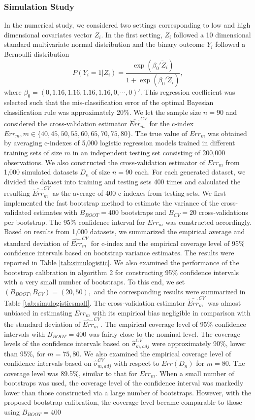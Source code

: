 \documentclass[12pt]{article}
\begin{document}
\subsubsection{Simulation Study}

In the numerical study,  we considered two settings corresponding to low and high dimensional covariates vector  $Z_i.$ In the first setting, $Z_i$ followed a 10 dimensional standard multivariate normal distribution and the binary outcome $Y_i$ followed a Bernoulli distribution 
$$P(Y_i=1|Z_i)=\frac{\exp(\beta_0'\tilde{Z}_i)}{1+\exp(\beta_0'\tilde{Z}_i)},$$
where $\beta_0=(0, 1.16, 1.16, 1.16, 1.16, 0, \cdots, 0)'.$ This regression coefficient was selected such that the mis-classification error of the optimal Bayesian classification rule was approximately 20\%. We let the sample size $n=90$ and considered the cross-validation estimator $\widehat{Err}_m^{CV}$ for the c-index $Err_m, m\in\{40, 45, 50, 55, 60, 65, 70, 75, 80\}.$ The true value of $Err_m$ was obtained by averaging c-indexes of 5,000 logistic regression models trained in different training sets of size $m$ in an independent testing set consisting of 200,000 observations. We also constructed the cross-validation estimator of $Err_m$ from 1,000 simulated datasets $D_n$ of size $n=90$ each.  For each generated dataset, we divided the dataset into training and testing sets 400 times and calculated the resulting $\widehat{Err}_m^{CV}$ as the average of 400 c-indexes from testing sets.  We first implemented the fast bootstrap method to estimate the variance of the cross-validated estimates with $B_{BOOT}=400$ bootstraps and $B_{CV}=20$ cross-validations per bootstrap. The 95\% confidence interval for $Err_m$ was constructed accordingly.  Based on results from 1,000 datasets, we summarized the empirical average and standard deviation of $\widehat{Err}_m^{CV}$ for c-index and the empirical coverage level of 95\% confidence intervals based on bootstrap variance estimates. The results were reported in Table \ref{tab:simulogistic}. We also examined the performance of the bootstrap calibration in algorithm 2 for constructing 95\% confidence intervals with a very small number of bootstraps. To this end, we set $(B_{BOOT}, B_{CV})=(20, 50),$ and the corresponding results were summarized in Table \ref{tab:simulogisticsmall}. The cross-validation estimator $\widehat{Err}_m^{CV}$ was almost unbiased in estimating $Err_m$ with its empirical bias negligible in comparison with the standard deviation of $\widehat{Err}_m^{CV}.$ The empirical coverage level of 95\% confidence intervals with $B_{BOOT}=400$ was fairly close to the nominal level. The coverage levels of the confidence intervals based on $\widehat{\sigma}_{m, adj}^{CV}$ were approximately 90\%, lower than 95\%, for $m=75, 80.$ We also examined the empirical coverage level of confidence intervals based on $\widehat{\sigma}_{m, adj}^{CV}$ with respect to $Err(D_n)$ for $m=80.$ The coverage level was 89.5\%, similar to that for $Err_m.$  When a small number of bootstraps was used, the coverage level of the confidence interval was markedly lower than those constructed via a large number of bootstraps.  However, with the proposed bootstrap calibration, the coverage level became comparable to those using $B_{BOOT}=400$ 
\end{document}

